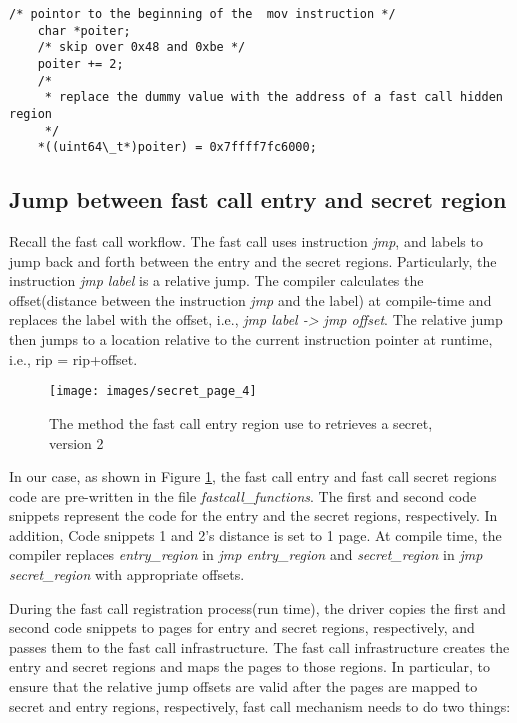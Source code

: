   \begin{lstlisting}[style=CStyle]
    /* pointor to the beginning of the  mov instruction */ 
    char *poiter;
    /* skip over 0x48 and 0xbe */ 
    poiter += 2; 
    /* 
     * replace the dummy value with the address of a fast call hidden region 
     */  
    *((uint64\_t*)poiter) = 0x7ffff7fc6000; 
  \end{lstlisting}


\subsection{Jump between fast call entry and secret region}

Recall the fast call workflow. The fast call uses instruction \emph{jmp}, 
and labels to jump back and forth between the entry and the secret regions. 
Particularly, the instruction \emph{jmp label} is a relative jump. 
The compiler calculates the offset(distance between the instruction \emph{jmp}
and the label) at compile-time and replaces the label with the offset, i.e., 
\emph{jmp label -> jmp offset}. The relative jump then jumps to a location relative to the current 
instruction pointer at runtime, i.e., rip = rip+offset.
\begin{figure}[H]
  \centering
  \texttt{[image: images/secret\_page\_4]}
  \caption[Short description]{The method the fast call entry region use to retrieves a 
  secret, version 2}
   \label{fig:secret_page_4}
\end{figure}
In our case, as shown in Figure \ref{fig:secret_page_4},  the fast call entry and fast call 
secret regions code are pre-written in the file \emph{fastcall\_functions}. 
The first and second code snippets represent the code for the entry and 
the secret regions, respectively. In addition,  Code snippets 1 and 2's 
distance is set to 1 page.  At compile time, the compiler replaces
\emph{entry\_region} in \emph{jmp entry\_region} and \emph{secret\_region} in \emph{jmp secret\_region}  
with appropriate offsets.  



During the fast call registration process(run time), 
the driver copies the first and second code snippets to pages for entry and secret 
regions, respectively, and passes them to the fast call infrastructure. 
The fast call infrastructure creates the entry and secret regions and maps the 
pages to those regions.  In particular, to ensure that the relative jump 
offsets are valid after the pages are mapped to secret and entry regions, 
respectively, fast call mechanism needs to do two things:


